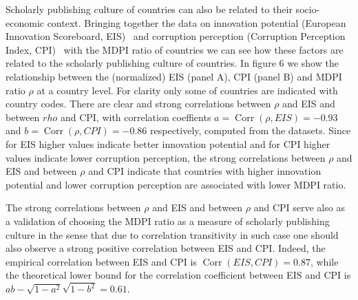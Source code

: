 \documentclass[amsfonts, amssymb, prl, superscriptaddress, notitlepage, twocolumn, nofootinbib]{revtex4-2}
\newcommand{\Corr}{\operatorname{Corr}}
\begin{document}
Scholarly publishing culture of countries can also be related to their socio-economic context. Bringing together the data on innovation potential (European Innovation Scoreboard, EIS)~\cite{european_innovation_scoreboard_2023} and corruption perception (Corruption Perception Index, CPI)~\cite{transparency_international_cpi_2022} with the MDPI ratio of countries we can see how these factors are related to the scholarly publishing culture of countries. In figure 6 we show the relationship between the (normalized) EIS (panel A), CPI (panel B) and MDPI ratio $\rho$ at a country level. For clarity only some of countries are indicated with country codes.
There are clear and strong correlations between $\rho$ and EIS and between $rho$ and CPI, with correlation coeffients $a=\Corr(\rho, EIS)=-0.93$ and $b=\Corr(\rho, CPI)=-0.86$ respectively, computed from the datasets. Since for EIS higher values indicate better innovation potential and for CPI higher values indicate lower corruption perception, the strong correlations between $\rho$ and EIS and between $\rho$ and CPI indicate that countries with higher innovation potential and lower corruption perception are associated with lower MDPI ratio. 

The strong correlations between $\rho$ and EIS and between $\rho$ and CPI serve also as a validation of choosing the MDPI ratio as a measure of scholarly publishing culture in the sense that due to correlation transitivity in such case one should also observe a strong positive correlation between EIS and CPI. Indeed, the empirical correlation between EIS and CPI is $\Corr(EIS, CPI)=0.87$, while the theoretical lower bound for the correlation coefficient between EIS and CPI is $ab-\sqrt{1-a^2}\sqrt{1-b^2}=0.61$.
\end{document}
